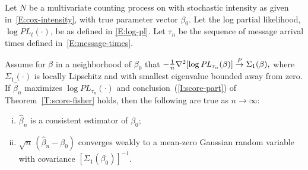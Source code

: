 \documentclass[aoas,preprint]{imsart}
\begin{document}
\begin{theorem}\label{T:consistency}
    Let $N$ be a multivariate counting process on with stochastic
    intensity as given in~\eqref{E:cox-intensity}, with true parameter
    vector $\beta_0$.  Let the log partial likelihood,
    $\log \mathit{PL}_t(\cdot)$, be as defined in \eqref{E:log-pl}.
    Let $\tau_n$ be the sequence of message arrival times defined
    in~\eqref{E:message-times}.

    Assume for $\beta$ in a
    neighborhood of $\beta_0$ that
    \(
        -\tfrac{1}{n} \nabla^2 [ \log \mathit{PL}_{\tau_n}(\beta)]
            \overset{\mathit{P}}{\to} \Sigma_1(\beta),
    \)
    where $\Sigma_1(\cdot)$ is locally Lipschitz and with smallest eigenvalue bounded
    away from zero.
    If $\hat \beta_n$ maximizes $\log \mathit{PL}_{\tau_n}(\cdot)$ and
    conclusion~(\ref{I:score-part}) of Theorem~\ref{T:score-fisher} holds,
    then the following are true as $n\to\infty$:
    \begin{enumerate}[(i)]
        \item $\hat \beta_n$ is a consistent estimator of $\beta_0$;
        \item $\sqrt{n} \, (\hat \beta_n - \beta_0)$ converges weakly
            to a mean-zero Gaussian random variable with covariance
            $[\Sigma_1(\beta_0)]^{-1}$.
    \end{enumerate}
\end{theorem}
\end{document}
